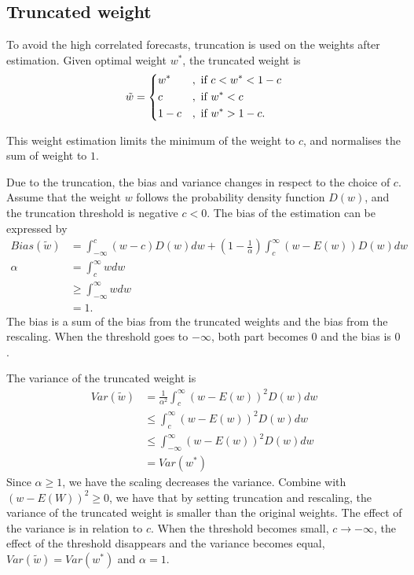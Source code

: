 \documentclass[11pt]{article}
\begin{document}
\subsection{Truncated weight}\label{truncated-weight}

To avoid the high correlated forecasts, truncation is used on the
weights after estimation. Given optimal weight $w^*$, the truncated weight is 
\begin{equation}
\label{eqn: w trunc}
\tilde{w} = 
\begin{dcases}
w^* &, \text{ if } c<w^*<1-c \\
c &, \text{ if } w^*<c \\
1-c &, \text{ if } w^*>1-c.
\end{dcases}
\end{equation}

This weight estimation limits the minimum of the weight to $c$, and normalises the sum of weight to $1$. 

Due to the truncation, the bias and variance changes in respect to the choice of $c$. Assume that the weight $w$ follows the probability density function $D(w)$, and the truncation threshold is negative $c<0$. The bias of the estimation can be expressed by
\begin{equation}
\label{eqn: bias trunc}
\begin{aligned}
Bias(\tilde{w}) &= \int_{-\infty}^{c} (w-c) D(w)dw + (1-\frac{1}{\alpha})\int_{c}^{\infty}( w-E(w))D(w)dw\\
\alpha &= \int_{c}^{\infty} w dw\\
&\geq \int_{-\infty}^{\infty} w dw\\
&=1.
\end{aligned}
\end{equation}
The bias is a sum of the bias from the truncated weights and the bias from the rescaling. When the threshold goes to $-\infty$, both part becomes $0$ and the bias is $0$.

The variance of the truncated weight is
\begin{equation}
\label{eqn: var trunc}
\begin{aligned}
Var(\tilde{w}) &= \frac{1}{\alpha^2} \int_{c}^{\infty} (w-E(w))^2 D(w) dw\\
&\leq \int_{c}^{\infty} (w-E(w))^2 D(w) dw\\
&\leq \int_{-\infty}^{\infty} (w-E(w))^2 D(w) dw\\
&=Var(w^*)
\end{aligned}
\end{equation}
Since $\alpha \geq 1$, we have the scaling decreases the variance. Combine with $(w-E(W))^2 \geq 0$, we have that by setting truncation and rescaling, the variance of the truncated weight is smaller than the original weights. The effect of the variance is in relation to $c$. When the threshold becomes small, $c \rightarrow -\infty$, the effect of the threshold disappears and the variance becomes equal, $Var(\tilde{w}) = Var(w^*)$ and $\alpha = 1$.
\end{document}
